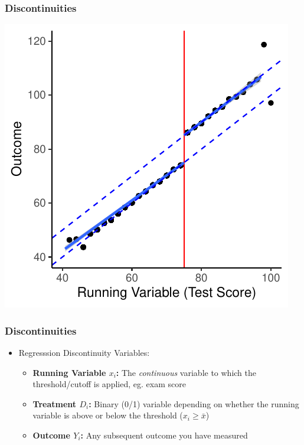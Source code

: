 \documentclass[xcolor=x11names,compress]{beamer}\usepackage[]{graphicx}\usepackage[]{color}
\makeatletter
\def\maxwidth{ %
  \ifdim\Gin@nat@width>\linewidth
    \linewidth
  \else
    \Gin@nat@width
  \fi
}
\newenvironment{knitrout}{}{} %
\renewcommand{\(}{\begin{columns}}
\renewcommand{\)}{\end{columns}}
\newcommand{\<}[1]{\begin{column}{#1}}
\renewcommand{\>}{\end{column}}
\makeatother
\begin{document}
\begin{frame}
\frametitle{Discontinuities}
\begin{knitrout}
\color{fgcolor}
\includegraphics[width=\maxwidth]{figure/chart2_binned_2-1} 

\end{knitrout}
\end{frame}


\begin{frame}
\frametitle{Discontinuities}
\begin{itemize}
\item Regresssion Discontinuity Variables:
\begin{itemize}
\item \textbf{Running Variable $x_i$:} The \textit{continuous} variable to which the threshold/cutoff is applied, eg. exam score
\pause
\item \textbf{Treatment $D_i$:} Binary (0/1) variable depending on whether the running variable is above or below the threshold ($x_i \geq \bar{x}$)
\pause
\item \textbf{Outcome $Y_i$:} Any subsequent outcome you have measured
\end{itemize}
\end{itemize}
\end{frame}
\end{document}
